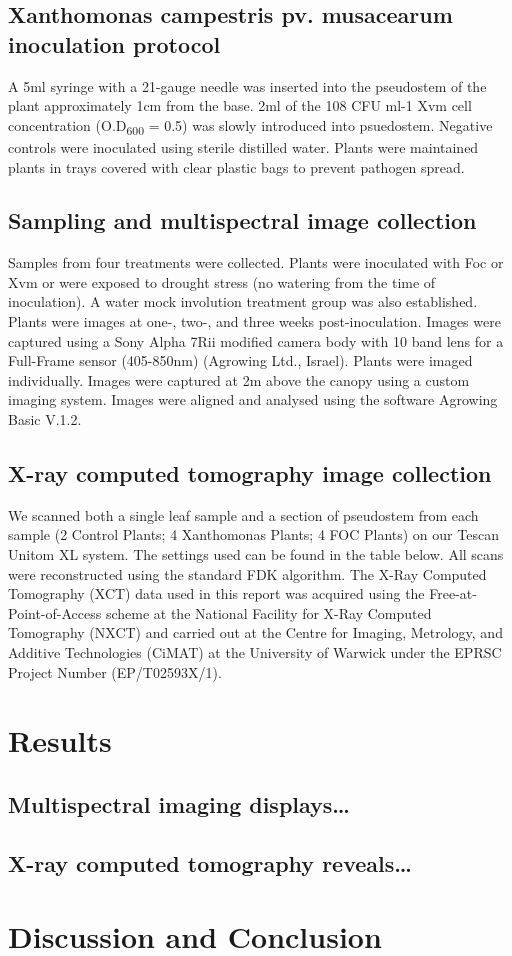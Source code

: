 \subsection{Xanthomonas campestris pv. musacearum inoculation protocol}
A 5ml syringe with a 21-gauge needle was inserted into the pseudostem of the plant approximately 1cm from the base. 2ml of the 108 CFU ml-1 Xvm cell concentration (O.D\textsubscript{600} = 0.5) was slowly introduced into psuedostem. Negative controls were inoculated using sterile distilled water. Plants were maintained plants in trays covered with clear plastic bags to prevent pathogen spread. 


\subsection{Sampling and multispectral image collection}
Samples from four treatments were collected. Plants were inoculated with Foc or Xvm or were exposed to drought stress (no watering from the time of inoculation). A water mock involution treatment group was also established. Plants were images at one-, two-, and three weeks post-inoculation. 
Images were captured using a Sony Alpha 7Rii modified camera body with 10 band lens for a Full-Frame sensor (405-850nm) (Agrowing Ltd., Israel). Plants were imaged individually. Images were captured at 2m above the canopy using a custom imaging system. Images were aligned and analysed using the software Agrowing Basic V.1.2.
\subsection{X-ray computed tomography image collection}
We scanned both a single leaf sample and a section of pseudostem from each sample (2 Control Plants; 4 Xanthomonas Plants; 4 FOC Plants) on our Tescan Unitom XL system. The settings used can be found in the table below. All scans were reconstructed using the standard FDK algorithm.
The X-Ray Computed Tomography (XCT) data used in this report was acquired using the Free-at-Point-of-Access scheme at the National Facility for X-Ray Computed Tomography (NXCT) and carried out at the Centre for Imaging, Metrology, and Additive Technologies (CiMAT) at the University of Warwick under the EPRSC Project Number (EP/T02593X/1).

\newpage
\section{Results }
\subsection{Multispectral imaging displays…}
\subsection{X-ray computed tomography reveals…}

\newpage
\section{Discussion and Conclusion}

